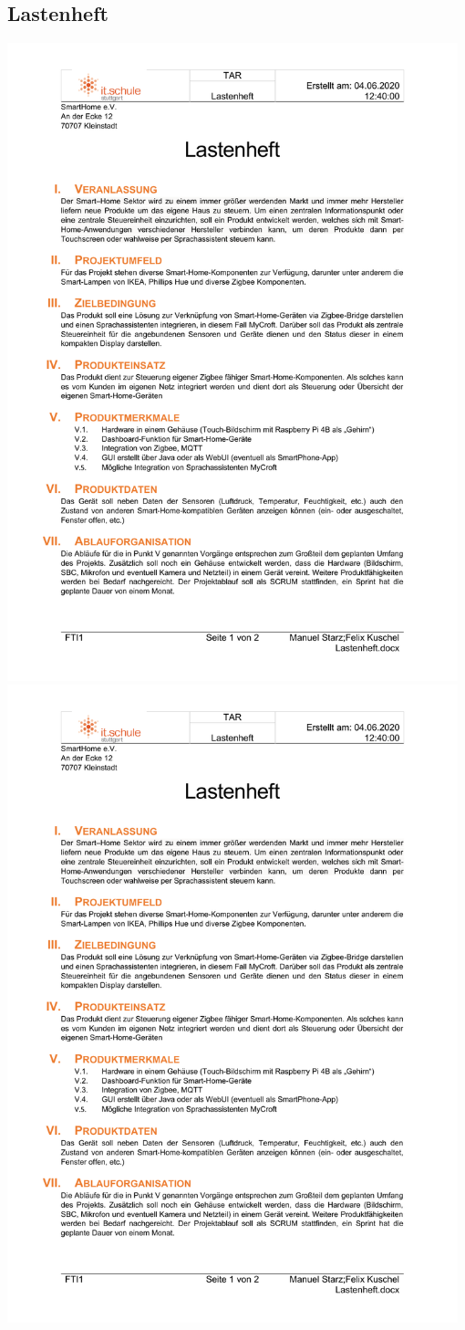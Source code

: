 \documentclass[12pt,a4paper]{article}
\begin{document}
 	\subsection{Lastenheft}
 	\includegraphics[width=0.98\textwidth, page=1]{lastenheft.pdf}
 	\newpage
 	\includegraphics[width=0.98\textwidth, page=2]{lastenheft.pdf}
\end{document}
